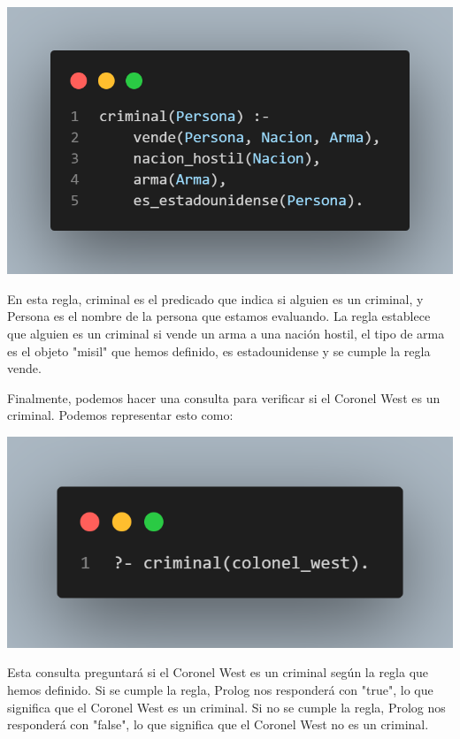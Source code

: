 \documentclass{article}
\begin{document}
\includegraphics[width=0.5\linewidth]{./img/code2.png}

En esta regla, criminal es el predicado que indica si alguien es un criminal, y Persona es el nombre de la persona que estamos evaluando. La regla establece que alguien es un criminal si vende un arma a una nación hostil, el tipo de arma es el objeto "misil" que hemos definido, es estadounidense y se cumple la regla vende.

Finalmente, podemos hacer una consulta para verificar si el Coronel West es un criminal. Podemos representar esto como:

\includegraphics[width=0.5\linewidth]{./img/code3.png}

Esta consulta preguntará si el Coronel West es un criminal según la regla que hemos definido. Si se cumple la regla, Prolog nos responderá con "true", lo que significa que el Coronel West es un criminal. Si no se cumple la regla, Prolog nos responderá con "false", lo que significa que el Coronel West no es un criminal.
\end{document}

